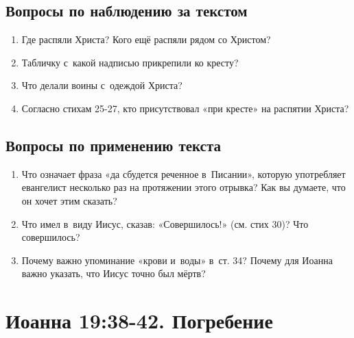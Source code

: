 \documentclass[a4paper,12pt]{article}
\begin{document}
\subsection*{Вопросы по наблюдению за текстом}
\begin{enumerate}
    \item Где распяли Христа? Кого ещё распяли рядом со Христом? 
    
    \myline
    
    \myline
    \item Табличку с~какой надписью прикрепили ко кресту? 
    
    \myline
    
    \myline
    \item Что делали воины с~одеждой Христа? 
    
    \myline
    
    \myline
    \item Согласно стихам 25-27, кто присутствовал «при кресте» на распятии Христа? 
    
    \myline
    
    \myline
\end{enumerate}

\subsection*{Вопросы по применению текста} 
\begin{enumerate}
    \item Что означает фраза «да сбудется реченное в~Писании», которую употребляет евангелист несколько раз на протяжении этого отрывка? Как вы думаете, что он хочет этим сказать? 
    
    \myline
    
    \myline
    \item Что имел в~виду Иисус, сказав: «Совершилось!» (см. стих 30)? Что совершилось?
    
    \myline
    
    \myline
    \item Почему важно упоминание «крови и~воды» в~ст. 34? Почему для Иоанна важно указать, что Иисус точно был мёртв? 
    
    \myline
    
    \myline
\end{enumerate}



\section{Иоанна 19:38-42. Погребение}
\end{document}

